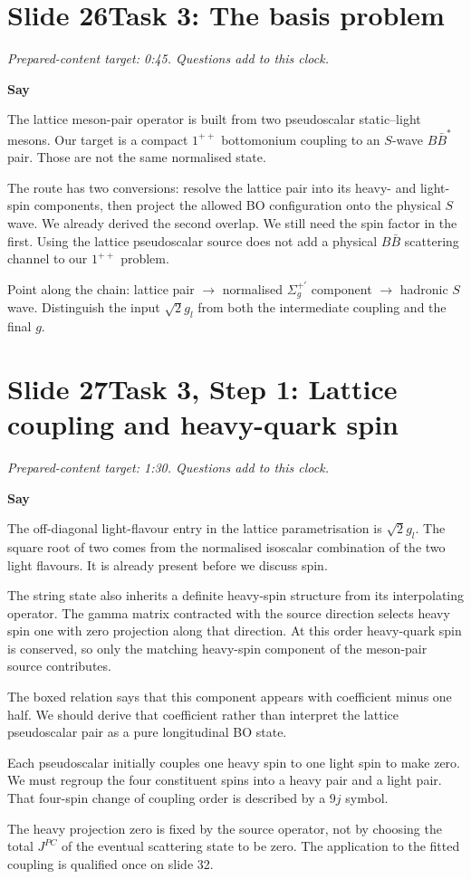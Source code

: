 \documentclass[11pt,a4paper]{article}
\newcommand{\BBst}{B\bar B^*}
\newcommand{\Sigmap}{\Sigma_g^{+\prime}}
\newcommand{\cue}[1]{\begin{private}#1\end{private}}
\newenvironment{speech}{\par\textbf{Say}\par}{\par}
\newcommand{\slidenote}[3]{%
  \clearpage
  \pdfbookmark[1]{Slide #1}{slide-#1}%
  \section*{Slide #1\quad #2}
  \textit{Prepared-content target: #3. Questions add to this clock.}\par
}
\begin{document}
\slidenote{26}{Task 3: The basis problem}{0:45}
\begin{speech}
The lattice meson-pair operator is built from two pseudoscalar
static--light mesons. Our target is a compact $1^{++}$ bottomonium
coupling to an $S$-wave $\BBst$ pair. Those are not the same
normalised state.

The route has two conversions: resolve the lattice pair into its
heavy- and light-spin components, then project the allowed BO
configuration onto the physical $S$ wave. We already derived the
second overlap. We still need the spin factor in the first.
Using the lattice pseudoscalar source does not add a physical
$B\bar B$ scattering channel to our $1^{++}$ problem.
\end{speech}
\cue{Point along the chain: lattice pair $\to$ normalised $\Sigmap$
component $\to$ hadronic $S$ wave. Distinguish the input $\sqrt2g_l$
from both the intermediate coupling and the final $g$.}

\slidenote{27}{Task 3, Step 1: Lattice coupling and heavy-quark spin}{1:30}
\begin{speech}
The off-diagonal light-flavour entry in the lattice parametrisation
is $\sqrt2g_l$. The square root of two comes from the normalised
isoscalar combination of the two light flavours. It is already
present before we discuss spin.

The string state also inherits a definite heavy-spin structure
from its interpolating operator. The gamma matrix contracted with
the source direction selects heavy spin one with zero projection
along that direction. At this order heavy-quark spin is conserved,
so only the matching heavy-spin component of the meson-pair source
contributes.

The boxed relation says that this component appears with coefficient
minus one half. We should derive that coefficient rather than
interpret the lattice pseudoscalar pair as a pure longitudinal BO
state.

Each pseudoscalar initially couples one heavy spin to one light
spin to make zero. We must regroup the four constituent spins into
a heavy pair and a light pair. That four-spin change of coupling
order is described by a $9j$ symbol.
\end{speech}
\cue{The heavy projection zero is fixed by the source operator, not by
choosing the total $J^{PC}$ of the eventual scattering state to be zero.
The application to the fitted coupling is qualified once on slide 32.}
\end{document}
